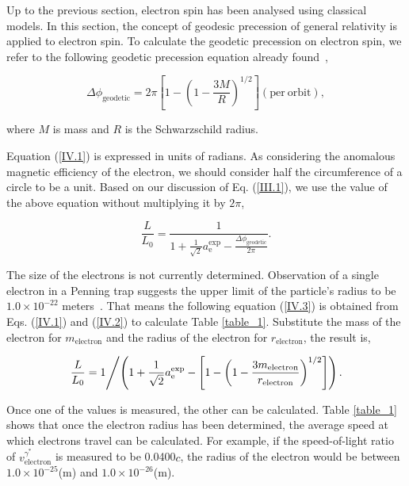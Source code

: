 \documentclass[%
 reprint,
 amsmath,amssymb,
 aps,
]{revtex4-1}
\numberwithin{equation}{section}%
\begin{document}
Up to the previous section, electron spin has been analysed using classical models. In this section, the concept of geodesic precession of general relativity is applied to electron spin. To calculate the geodetic precession on electron spin, we refer to the following geodetic precession equation already found~\cite{Hartle},

\begin{equation}
    \Delta \phi_{\mathrm{geodetic}} = 2 \pi \left[ 1 - \left( 1 - \frac{3M}{R} \right)^{1/2} \right] \mathrm{(per \ orbit)},
    \label{IV.1}
\end{equation}

\noindent where $M$ is mass and $R$ is the Schwarzschild radius.

Equation (\ref{IV.1}) is expressed in units of radians. As considering the anomalous magnetic efficiency of the electron, we should consider half the circumference of a circle to be a unit. Based on our discussion of Eq. (\ref{III.1}), we use the value of the above equation without multiplying it by $2 \pi$,

\begin{equation}
    \frac{L}{L_0} = \frac{1}{1 + \frac{1}{\sqrt{2}}a^{\text{exp}}_{\text{e}} - \frac{\Delta \phi_{\mathrm{geodetic}}}{2 \pi}} .
    \label{IV.2}
\end{equation}

The size of the electrons is not currently determined. Observation of a single electron in a Penning trap suggests the upper limit of the particle's radius to be $1.0 \times 10^{-22}$ meters~\cite{Dehmelt}. That means the following equation (\ref{IV.3}) is obtained from Eqs. (\ref{IV.1}) and (\ref{IV.2}) to calculate Table \ref{table_1}.  Substitute the mass of the electron for $m_{\mathrm{electron}}$ and the radius of the electron for $r_{\mathrm{electron}}$, the result is,

\begin{equation}
    \left.
    \frac{L}{L_0} = 1
    \middle/
    \left( {1 + \frac{1}{\sqrt{2}}a^{\text{exp}}_{\text{e}} - \left[ 1 - \left( 1 - \frac{3 m_{\mathrm{electron}}}{r_{\mathrm{electron}}} \right)^{1/2} \right]} \right).
    \right.
    \label{IV.3}
\end{equation}


Once one of the values is measured, the other can be calculated. Table \ref{table_1} shows that once the electron radius has been determined, the average speed at which electrons travel can be calculated. For example, if the speed-of-light ratio of $ v_{\text{electron}}^{\gamma^{*}} $ is measured to be 0.0400$c$, the radius of the electron would be between $1.0 \times 10^{-25}$(m) and $1.0 \times 10^{-26}$(m).
\end{document}
